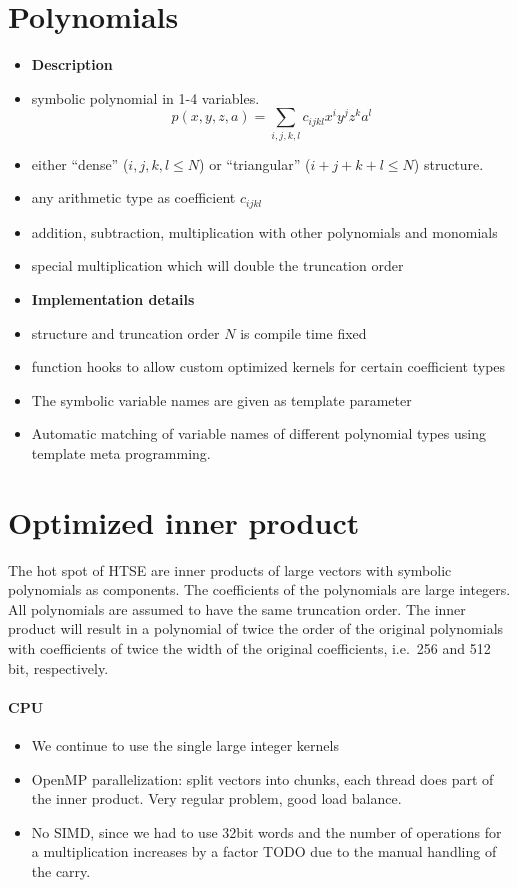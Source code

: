 \documentclass[oribibl]{llncs2e/llncs}
\begin{document}
\section{Polynomials}
\begin{itemize}
\item {\bf Description}
\item symbolic polynomial in 1-4 variables.
\begin{equation}
    p(x,y,z,a) = \sum_{i,j,k,l} c_{ijkl} x^i y^j z^k a^l
\end{equation}
\item either ``dense'' (${i,j,k,l} \le N$) or ``triangular'' ($i+j+k+l \le N$) structure.
\item any arithmetic type as coefficient $c_{ijkl}$
\item addition, subtraction, multiplication with other polynomials and monomials
\item special multiplication which will double the truncation order
\item {\bf Implementation details}
\item structure and truncation order $N$ is compile time fixed 
\item function hooks to allow custom optimized kernels for certain coefficient types
\item The symbolic variable names are given as template parameter
\item Automatic matching of variable names of different polynomial types using template meta programming.
\end{itemize}

\section{Optimized inner product}
The hot spot of HTSE are inner products of large vectors with symbolic polynomials as components. The coefficients of the polynomials are large integers.
All polynomials are assumed to have the same truncation order.
The inner product will result in a polynomial of twice the order of the original polynomials
with coefficients of twice the width of the original coefficients, i.e.\ 256 and
512 bit, respectively.
\paragraph{CPU}
\begin{itemize}
\item We continue to use the single large integer kernels
\item OpenMP parallelization: split vectors into chunks, each thread does part of the inner product. Very regular problem, good load balance.
\item No SIMD, since we had to use 32bit words and the number of operations for a multiplication increases by a factor TODO due to the manual handling of the carry.
\end{itemize}
\end{document}
